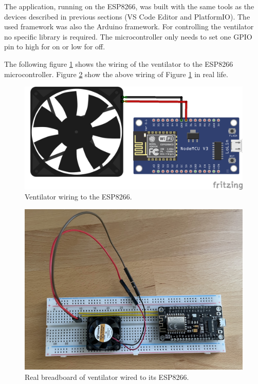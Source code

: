 \bigskip
The application, running on the ESP8266, was built with the same tools as the devices described in previous sections (VS Code Editor and PlatformIO). The used framework was also the Arduino framework. For controlling the ventilator no specific library is required. The microcontroller only needs to set one GPIO pin to high for on or low for off.

\bigskip
The following figure \ref{fig:wiring-ventilator} shows the wiring of the ventilator to the ESP8266 microcontroller. Figure \ref{fig:ventilator} show the above wiring of Figure \ref{fig:wiring-ventilator} in real life.

\begin{figure}[H]
    \centering
    \includegraphics[width=\textwidth]{assets/setup/wiring-ventilator.png}
    \caption{Ventilator wiring to the ESP8266.}\label{fig:wiring-ventilator}
\end{figure}

\begin{figure}[H]
    \centering
    \includegraphics[width=\textwidth]{assets/setup/ventilator.jpeg}
    \caption{Real breadboard of ventilator wired to its ESP8266.}\label{fig:ventilator}
\end{figure}


